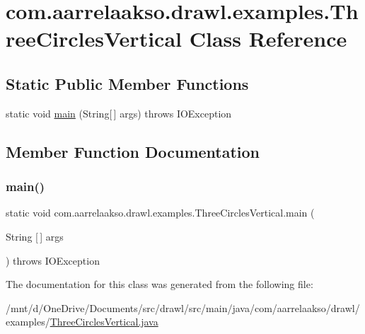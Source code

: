 \hypertarget{classcom_1_1aarrelaakso_1_1drawl_1_1examples_1_1_three_circles_vertical}{}\section{com.\+aarrelaakso.\+drawl.\+examples.\+Three\+Circles\+Vertical Class Reference}
\label{classcom_1_1aarrelaakso_1_1drawl_1_1examples_1_1_three_circles_vertical}
\subsection*{Static Public Member Functions}
\begin{DoxyCompactItemize}
\item 
static void \hyperlink{classcom_1_1aarrelaakso_1_1drawl_1_1examples_1_1_three_circles_vertical_a5b7bb6e28019bcb3a74ce6178ee667fd}{main} (String\mbox{[}$\,$\mbox{]} args)  throws I\+O\+Exception 
\end{DoxyCompactItemize}


\subsection{Member Function Documentation}
\mbox{\label{classcom_1_1aarrelaakso_1_1drawl_1_1examples_1_1_three_circles_vertical_a5b7bb6e28019bcb3a74ce6178ee667fd}} 
\subsubsection{\texorpdfstring{main()}{main()}}
{\footnotesize\ttfamily static void com.\+aarrelaakso.\+drawl.\+examples.\+Three\+Circles\+Vertical.\+main (\begin{DoxyParamCaption}\item[{String \mbox{[}$\,$\mbox{]}}]{args }\end{DoxyParamCaption}) throws I\+O\+Exception\hspace{0.3cm}{\ttfamily [static]}}



The documentation for this class was generated from the following file\+:\begin{DoxyCompactItemize}
\item 
/mnt/d/\+One\+Drive/\+Documents/src/drawl/src/main/java/com/aarrelaakso/drawl/examples/\hyperlink{_three_circles_vertical_8java}{Three\+Circles\+Vertical.\+java}\end{DoxyCompactItemize}
